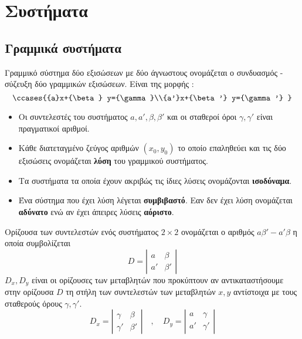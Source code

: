 \chapter{Συστήματα}
\section{Γραμμικά συστήματα}
\orismoi
{}
Γραμμικό σύστημα δύο εξισώσεων με δύο άγνωστους ονομάζεται ο συνδυασμός - σύζευξη δύο γραμμικών εξισώσεων. Είναι της μορφής :
\[ \ccases{{a}x+{\beta} y={\gamma}\\{a'}x+{\beta'} y={\gamma'} } \]
\begin{itemize}[itemsep=0mm]
\item Οι συντελεστές του συστήματος $ a,a',\beta,\beta' $ και οι σταθεροί όροι $ \gamma,\gamma' $ είναι πραγματικοί αριθμοί.
\item Κάθε διατεταγμένο ζεύγος αριθμών $ \left(x_0,y_0\right)  $ το οποίο επαληθεύει και τις δύο εξισώσεις ονομάζεται \textbf{λύση} του γραμμικού συστήματος.
\item Τα συστήματα τα οποία έχουν ακριβώς τις ίδιες λύσεις ονομάζονται \textbf{ισοδύναμα}.
\item Ένα σύστημα που έχει λύση λέγεται \textbf{συμβιβαστό}. Εαν δεν έχει λύση ονομάζεται \textbf{αδύνατο} ενώ αν έχει άπειρες λύσεις \textbf{αόριστο}.
\end{itemize}
Ορίζουσα των συντελεστών ενός συστήματος $ 2\times2 $ ονομάζεται ο αριθμός $ a\beta'-a'\beta $ η οποία συμβολίζεται
\[ D=\left|\begin{array}{cc}
a & \beta \\ 
a' & \beta'
\end{array}  \right|  \]
$ D_x,D_y $ είναι οι ορίζουσες των μεταβλητών που προκύπτουν αν αντικαταστήσουμε στην ορίζουσα $ D $ τη στήλη των συντελεστών των μεταβλητών $ x,y $ αντίστοιχα με τους σταθερούς όρους $ \gamma,\gamma' $.
\[ D_x=\left|\begin{array}{cc}
\gamma & \beta \\ 
\gamma' & \beta'
\end{array}  \right|\quad,\quad D_y=\left|\begin{array}{cc}
a & \gamma \\ 
a' & \gamma'
\end{array}  \right| \]\mbox{}\\
\thewrhmata
{}

